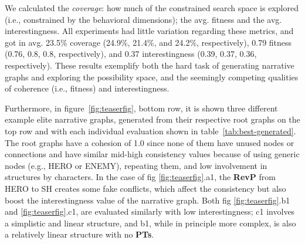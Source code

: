 
We calculated the \textit{coverage}: how much of the constrained search space is explored (i.e., constrained by the behavioral dimensions); the avg. fitness and the avg. interestingness. All experiments had little variation regarding these metrics, and got in avg. 23.5\% coverage (24.9\%, 21.4\%, and 24.2\%, respectively), 0.79 fitness (0.76, 0.8, 0.8, respectively), and 0.37 interestingness (0.39, 0.37, 0.36, respectively). These results exemplify both the hard task of generating narrative graphs and exploring the possibility space, and the seemingly competing qualities of coherence (i.e., fitness) and interestingness. 



Furthermore, in figure~\ref{fig:teaserfig}, bottom row, it is shown three different example elite narrative graphs, generated from their respective root graphs on the top row and with each individual evaluation shown in table~\ref{tab:best-generated}. The root graphs have a cohesion of 1.0 since none of them have unused nodes or connections and have similar mid-high consistency values because of using generic nodes (e.g., HERO or ENEMY), repeating them, and low involvement in structures by characters. In the case of fig \ref{fig:teaserfig}.a1, the \textbf{RevP} from HERO to SH creates some fake conflicts, which affect the consistency but also boost the interestingness value of the narrative graph. Both fig \ref{fig:teaserfig}.b1 and \ref{fig:teaserfig}.c1, are evaluated similarly with low interestingness; c1 involves a simplistic and linear structure, and b1, while in principle more complex, is also a relatively linear structure with no \textbf{PTs}.

